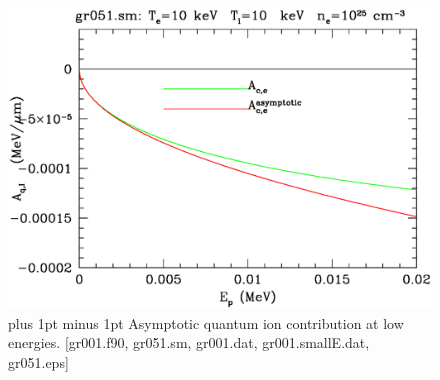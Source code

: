 \documentclass[preprint,12pt,eqsecnum,nofootinbib,amsmath,amssymb]{revtex4}
\newcommand{\footnoteskip}{\baselineskip 12pt plus 1pt minus 1pt}
\begin{document}
~

\vskip-2.0cm 
\begin{figure}[h!]
\includegraphics[scale=0.45]{gr051.eps} 
\vskip-0.8cm 
\caption{\footnoteskip  
  Asymptotic quantum ion contribution at low energies. [gr001.f90,
  gr051.sm, gr001.dat, gr001.smallE.dat, gr051.eps]
}
\label{fig:gr051}
\end{figure}
\end{document}

